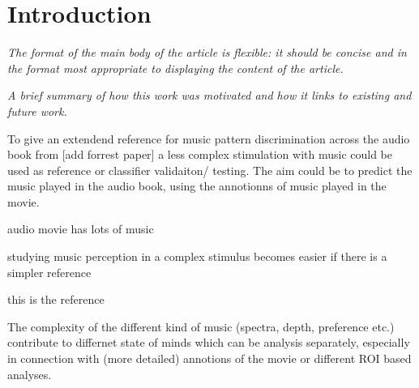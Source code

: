 \section*{Introduction} 
\textit{The format of the main body of the article is flexible: it should be concise and in the format most appropriate to displaying the content of the article.}

\textit{A brief summary of how this work was motivated and how it links to existing and future work.}

To give an extendend reference for music pattern discrimination across the audio book from [add forrest paper] a less complex stimulation with music could be used as reference or classifier validaiton/ testing. The aim could be to predict the music played in the audio book, using the annotionns of music played in the movie.

audio movie has lots of music

studying music perception in a complex stimulus becomes easier if there is a simpler reference

this is the reference

The complexity of the different kind of music (spectra, depth, preference etc.)  contribute to differnet state of minds which can be analysis separately, especially in connection with (more detailed) annotions of the movie or different ROI based analyses.

\cite{Casey_2012}